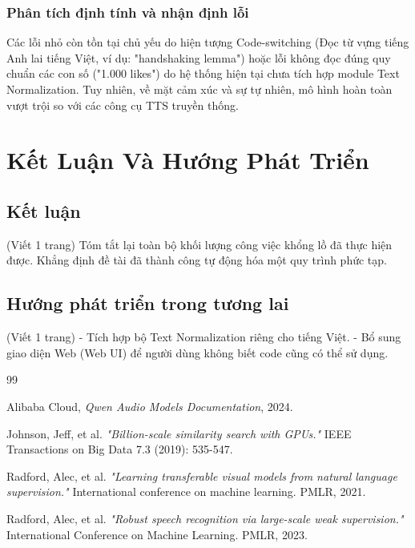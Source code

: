 \documentclass[a4paper,13pt]{report}
\begin{document}
\subsection{Phân tích định tính và nhận định lỗi}
Các lỗi nhỏ còn tồn tại chủ yếu do hiện tượng Code-switching (Đọc từ vựng tiếng Anh lai tiếng Việt, ví dụ: "handshaking lemma") hoặc lỗi không đọc đúng quy chuẩn các con số ("1.000 likes") do hệ thống hiện tại chưa tích hợp module Text Normalization. Tuy nhiên, về mặt cảm xúc và sự tự nhiên, mô hình hoàn toàn vượt trội so với các công cụ TTS truyền thống.

\chapter{Kết Luận Và Hướng Phát Triển}

\section{Kết luận}
(Viết 1 trang)
Tóm tắt lại toàn bộ khối lượng công việc khổng lồ đã thực hiện được. Khẳng định đề tài đã thành công tự động hóa một quy trình phức tạp.

\section{Hướng phát triển trong tương lai}
(Viết 1 trang)
- Tích hợp bộ Text Normalization riêng cho tiếng Việt.
- Bổ sung giao diện Web (Web UI) để người dùng không biết code cũng có thể sử dụng.

\begin{thebibliography}{99}

Alibaba Cloud, \textit{Qwen Audio Models Documentation}, 2024.

Johnson, Jeff, et al. \textit{"Billion-scale similarity search with GPUs."} IEEE Transactions on Big Data 7.3 (2019): 535-547.

Radford, Alec, et al. \textit{"Learning transferable visual models from natural language supervision."} International conference on machine learning. PMLR, 2021.

Radford, Alec, et al. \textit{"Robust speech recognition via large-scale weak supervision."} International Conference on Machine Learning. PMLR, 2023.

\end{thebibliography}
\end{document}

